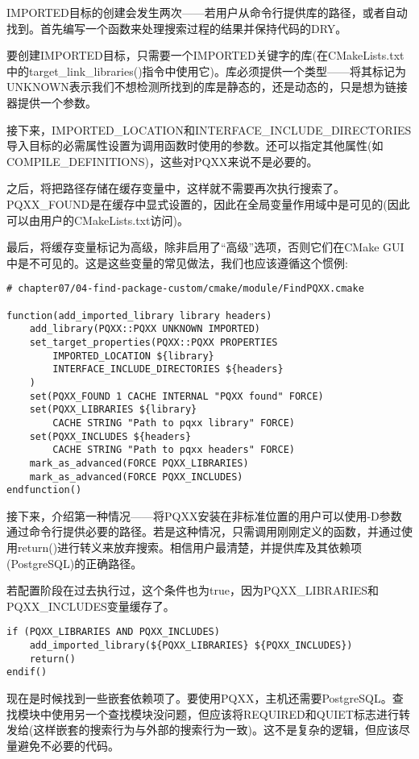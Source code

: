 IMPORTED目标的创建会发生两次——若用户从命令行提供库的路径，或者自动找到。首先编写一个函数来处理搜索过程的结果并保持代码的DRY。

要创建IMPORTED目标，只需要一个IMPORTED关键字的库(在CMakeLists.txt中的target\_link\_libraries()指令中使用它)。库必须提供一个类型——将其标记为UNKNOWN表示我们不想检测所找到的库是静态的，还是动态的，只是想为链接器提供一个参数。

接下来，IMPORTED\_LOCATION和INTERFACE\_INCLUDE\_DIRECTORIES导入目标的必需属性设置为调用函数时使用的参数。还可以指定其他属性(如COMPILE\_DEFINITIONS)，这些对PQXX来说不是必要的。

之后，将把路径存储在缓存变量中，这样就不需要再次执行搜索了。PQXX\_FOUND是在缓存中显式设置的，因此在全局变量作用域中是可见的(因此可以由用户的CMakeLists.txt访问)。

最后，将缓存变量标记为高级，除非启用了“高级”选项，否则它们在CMake GUI中是不可见的。这是这些变量的常见做法，我们也应该遵循这个惯例:

\begin{lstlisting}[style=styleCMake]
# chapter07/04-find-package-custom/cmake/module/FindPQXX.cmake

function(add_imported_library library headers)
	add_library(PQXX::PQXX UNKNOWN IMPORTED)
	set_target_properties(PQXX::PQXX PROPERTIES
		IMPORTED_LOCATION ${library}
		INTERFACE_INCLUDE_DIRECTORIES ${headers}
	)
	set(PQXX_FOUND 1 CACHE INTERNAL "PQXX found" FORCE)
	set(PQXX_LIBRARIES ${library}
		CACHE STRING "Path to pqxx library" FORCE)
	set(PQXX_INCLUDES ${headers}
		CACHE STRING "Path to pqxx headers" FORCE)
	mark_as_advanced(FORCE PQXX_LIBRARIES)
	mark_as_advanced(FORCE PQXX_INCLUDES)
endfunction()
\end{lstlisting}

接下来，介绍第一种情况——将PQXX安装在非标准位置的用户可以使用-D参数通过命令行提供必要的路径。若是这种情况，只需调用刚刚定义的函数，并通过使用return()进行转义来放弃搜索。相信用户最清楚，并提供库及其依赖项(PostgreSQL)的正确路径。

若配置阶段在过去执行过，这个条件也为true，因为PQXX\_LIBRARIES和PQXX\_INCLUDES变量缓存了。

\begin{lstlisting}[style=styleCMake]
if (PQXX_LIBRARIES AND PQXX_INCLUDES)
	add_imported_library(${PQXX_LIBRARIES} ${PQXX_INCLUDES})
	return()
endif()
\end{lstlisting}

现在是时候找到一些嵌套依赖项了。要使用PQXX，主机还需要PostgreSQL。查找模块中使用另一个查找模块没问题，但应该将REQUIRED和QUIET标志进行转发给(这样嵌套的搜索行为与外部的搜索行为一致)。这不是复杂的逻辑，但应该尽量避免不必要的代码。

